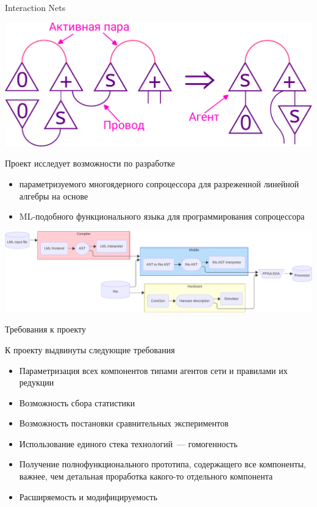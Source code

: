 \documentclass
  [ russian
  , aspectratio=169 %
  ] {beamer}
\begin{document}
\begin{frame}{Interaction Nets}

    \begin{center}
        \includegraphics[width=\textwidth]{figures/in_talk.pdf}
    \end{center}

\end{frame}

\begin{frame}{\Lamagraph{}}

    Проект \Lamagraph{} исследует возможности по разработке
    \begin{itemize}
        \item параметризуемого многоядерного сопроцессора для разреженной линейной алгебры на основе \INs{}
        \item ML-подобного функционального языка для программирования сопроцессора
    \end{itemize}
    \begin{center}
        \includegraphics[width=\linewidth]{figures/lamagraph-big-horiz.pdf}
    \end{center}

\end{frame}

\begin{frame}{Требования к проекту}

    К проекту выдвинуты следующие требования
    \begin{itemize}
        \item Параметризация всех компонентов типами агентов сети и правилами их редукции
        \item Возможность сбора статистики
        \item Возможность постановки сравнительных экспериментов
        \item Использование единого стека технологий~--- гомогенность
        \item Получение полнофункционального прототипа, содержащего все компоненты, важнее, чем детальная проработка какого-то отдельного компонента
        \item Расширяемость и модифицируемость
    \end{itemize}

\end{frame}
\end{document}
